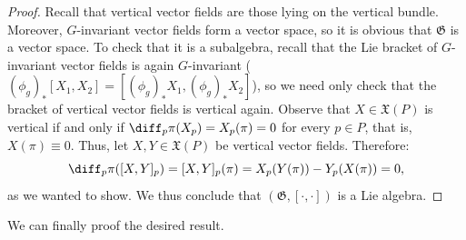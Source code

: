 \begin{proof}
    Recall that vertical vector fields are those lying on the vertical bundle. Moreover, \(G\)-invariant vector fields form a vector space, so it is obvious that \(\mathfrak{G}\) is a vector space. To check that it is a subalgebra, recall that the Lie bracket of \(G\)-invariant vector fields is again \(G\)-invariant (\((\phi_g)_*[X_1, X_2]=[(\phi_g)_*X_1, (\phi_g)_*X_2]\)), so we need only check that the bracket of vertical vector fields is vertical again. Observe that \(X \in \mathfrak{X}(P)\) is vertical if and only if \(\diff_p\pi(X_p)=X_p(\pi)=0\) for every \(p \in P\), that is, \(X(\pi) \equiv 0\). Thus, let \(X,Y \in \mathfrak{X}(P)\) be vertical vector fields. Therefore:
    \[
    \diff_p\pi([X,Y]_p)=[X,Y]_p(\pi)=X_p(Y(\pi))-Y_p(X(\pi))=0,
    \]
    as we wanted to show. We thus conclude that \((\mathfrak{G}, [\cdot, \cdot])\) is a Lie algebra.
\end{proof}

We can finally proof the desired result.

